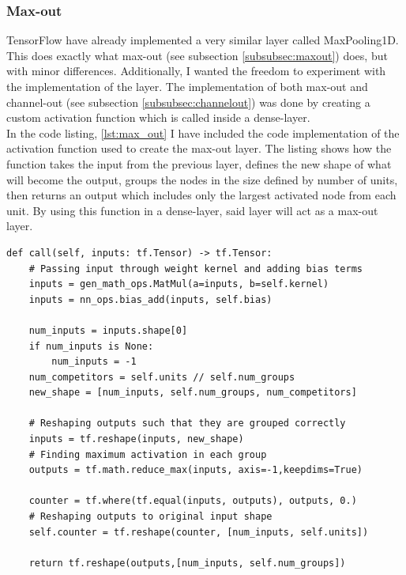 \subsubsection*{Max-out}
TensorFlow have already implemented a very similar layer called MaxPooling1D. This does 
exactly what max-out (see subsection \ref{subsubsec:maxout}) does, but with minor differences. 
Additionally, I wanted the freedom to experiment with the implementation of the layer. The 
implementation of both max-out and channel-out (see subsection \ref{subsubsec:channelout}) 
was done by creating a custom activation function which is called inside a dense-layer. 
\\
In the code listing, \ref{lst:max_out} I have included the code implementation of the
activation function used to create the max-out layer. The listing shows how the function
takes the input from the previous layer, defines the new shape of what will become the 
output, groups the nodes in the size defined by number of units, then returns an output 
which includes only the largest activated node from each unit. By using this function 
in a dense-layer, said layer will act as a max-out layer. 
\lstset{style=Python}
\begin{lstlisting}[caption={Python implementation for the custom activation function used to define the max-out layer.},captionpos=b, label={lst:max_out}]
def call(self, inputs: tf.Tensor) -> tf.Tensor:
    # Passing input through weight kernel and adding bias terms
    inputs = gen_math_ops.MatMul(a=inputs, b=self.kernel)
    inputs = nn_ops.bias_add(inputs, self.bias)

    num_inputs = inputs.shape[0]
    if num_inputs is None:
        num_inputs = -1
    num_competitors = self.units // self.num_groups
    new_shape = [num_inputs, self.num_groups, num_competitors]

    # Reshaping outputs such that they are grouped correctly
    inputs = tf.reshape(inputs, new_shape)
    # Finding maximum activation in each group
    outputs = tf.math.reduce_max(inputs, axis=-1,keepdims=True)

    counter = tf.where(tf.equal(inputs, outputs), outputs, 0.)
    # Reshaping outputs to original input shape
    self.counter = tf.reshape(counter, [num_inputs, self.units])

    return tf.reshape(outputs,[num_inputs, self.num_groups])   
\end{lstlisting}
